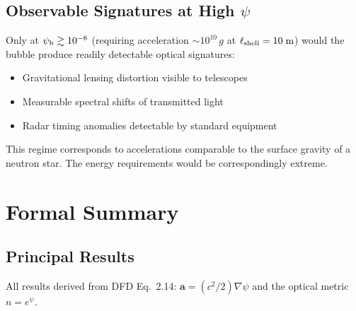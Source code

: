 \documentclass[12pt,aps,prd,superscriptaddress,nofootinbib]{revtex4-2}
\newcommand{\psib}{\psi_{\rm b}}
\newcommand{\Lshell}{\ell_{\rm shell}}
\begin{document}
\subsection{Observable Signatures at High $\psi$}

Only at $\psib \gtrsim 10^{-6}$ (requiring acceleration
$\sim 10^{10}\,g$ at $\Lshell = 10\;\si{m}$) would the bubble
produce readily detectable optical signatures:
\begin{itemize}
\item Gravitational lensing distortion visible to telescopes
\item Measurable spectral shifts of transmitted light
\item Radar timing anomalies detectable by standard equipment
\end{itemize}

This regime corresponds to accelerations comparable to the surface
gravity of a neutron star. The energy requirements would be
correspondingly extreme.


\section{Formal Summary}\label{sec:summary}

\subsection{Principal Results}

All results derived from DFD Eq.~2.14:
$\mathbf{a} = (c^2/2)\nabla\psi$ and the optical metric
$n = e^{\psi}$.
\end{document}
